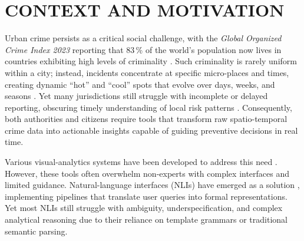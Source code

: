 \chapter{CONTEXT AND MOTIVATION} 



Urban crime persists as a critical social challenge, with the \emph{Global Organized Crime Index 2023} reporting that 83\,\% of the world’s population now lives in countries exhibiting high levels of criminality \citep{GlobalCrimeIndex2023}.
Such criminality is rarely uniform within a city; instead, incidents concentrate at specific micro-places and times, creating dynamic “hot” and “cool” spots that evolve over days, weeks, and seasons \citep{Garcia2022CriPAV}.
Yet many jurisdictions still struggle with incomplete or delayed reporting, obscuring timely understanding of local risk patterns \citep{NSSFCrimeReporting2023}. Consequently, both authorities and citizens require tools that transform raw spatio-temporal crime data into actionable insights capable of guiding preventive decisions in real time.

Various visual-analytics systems have been developed to address this need \citep{Salah2022BigCDVis, Silva2017CrimeVisAI, Garcia2020MiranteAV, Garcia2021CrimAnalyzer}. However, these tools often overwhelm non-experts with complex interfaces and limited guidance. Natural-language interfaces (NLIs) have emerged as a solution \citep{Setlur2016Eviza, Narechania2021NL4DV, Luo2022NL2Vis, Liu2021ADVISor, Sah2024GeneratingAnalyticsDataVizLLMs}, implementing pipelines that translate user queries into formal representations. Yet most NLIs still struggle with ambiguity, underspecification, and complex analytical reasoning due to their reliance on template grammars or traditional semantic parsing.
 

